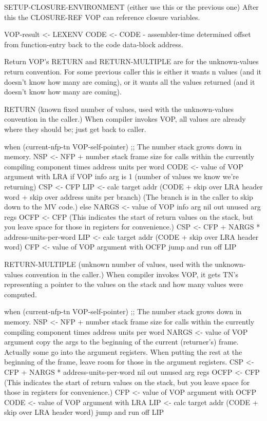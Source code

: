 SETUP-CLOSURE-ENVIRONMENT
(either use this or the previous one)
After this the CLOSURE-REF VOP can reference closure variables.

VOP-result <- LEXENV
CODE <- CODE - assembler-time determined offset from function-entry back to
	       the code data-block address.

Return VOP's
RETURN and RETURN-MULTIPLE are for the unknown-values return convention.
For some previous caller this is either it wants n values (and it doesn't
know how many are coming), or it wants all the values returned (and it 
doesn't know how many are coming).


RETURN
(known fixed number of values, used with the unknown-values convention
 in the caller.)
When compiler invokes VOP, all values are already where they should be;
just get back to caller.

when (current-nfp-tn VOP-self-pointer)
  ;; The number stack grows down in memory.
  NSP <- NFP + number stack frame size for calls within the currently
                  compiling component
	       times address units per word
CODE <- value of VOP argument with LRA
if VOP info arg is 1 (number of values we know we're returning)
  CSP <- CFP
  LIP <- calc target addr
          (CODE + skip over LRA header word + skip over address units per branch)
	  (The branch is in the caller to skip down to the MV code.)
else
  NARGS <- value of VOP info arg
  nil out unused arg regs
  OCFP <- CFP  (This indicates the start of return values on the stack,
  		but you leave space for those in registers for convenience.)
  CSP <- CFP + NARGS * address-units-per-word
  LIP <- calc target addr (CODE + skip over LRA header word)
CFP <- value of VOP argument with OCFP
jump and run off LIP

RETURN-MULTIPLE
(unknown number of values, used with the unknown-values convention in
 the caller.)
When compiler invokes VOP, it gets TN's representing a pointer to the
values on the stack and how many values were computed.

when (current-nfp-tn VOP-self-pointer)
  ;; The number stack grows down in memory.
  NSP <- NFP + number stack frame size for calls within the currently
                  compiling component
	       times address units per word
NARGS <- value of VOP argument
copy the args to the beginning of the current (returner's) frame.
   Actually some go into the argument registers.  When putting the rest at
   the beginning of the frame, leave room for those in the argument registers.
CSP <- CFP + NARGS * address-units-per-word
nil out unused arg regs
OCFP <- CFP  (This indicates the start of return values on the stack,
	      but you leave space for those in registers for convenience.)
CFP <- value of VOP argument with OCFP
CODE <- value of VOP argument with LRA
LIP <- calc target addr (CODE + skip over LRA header word)
jump and run off LIP


